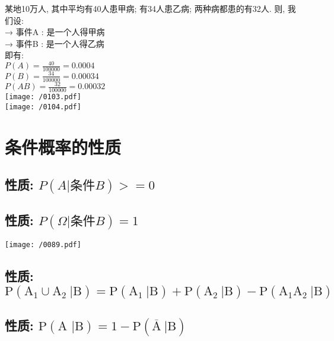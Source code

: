\documentclass[UTF8]{ctexart}
\begin{document}
	
	
	\begin{myEnvSample}
		某地10万人, 其中平均有40人患甲病; 有34人患乙病; 两种病都患的有32人. 		则, 我们设: \\
		→ 事件A : 是一个人得甲病 \\
		→ 事件B : 是一个人得乙病 \\
		
		即有: \\
		$		P(A)=\frac{40}{100000}=0.0004		$ \\
		$		P(B)=\frac{34}{100000}=0.00034		$ \\
		$		P(AB)=\frac{32}{100000}=0.00032		$ \\
		\texttt{[image: /0103.pdf]} \\
		\texttt{[image: /0104.pdf]} 	
	\end{myEnvSample}
	
	
	

	
	\section{条件概率的性质}
	
	\subsection{性质: $ P(A | \text{条件}B) >= 0$}
	
	
	\subsection{性质: $ P(\Omega | \text{条件}B) = 1$}
	
	\texttt{[image: /0089.pdf]}
	
	
	\subsection{性质: $ \text{P}\left( \text{A}_1\cup \text{A}_2\ |\text{B} \right) =\text{P}\left( \text{A}_1\ |\text{B} \right) +\text{P}\left( \text{A}_2\ |\text{B} \right) -\text{P}\left( \text{A}_1\text{A}_2\ |\text{B} \right) 		$}
	
	\subsection{性质: $	\text{P}\left( \text{A\ |B} \right) =1-\text{P}\left( \overline{\text{A}}\ |\text{B} \right) 	$}
	
\end{document}
